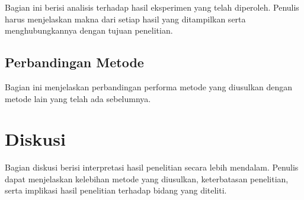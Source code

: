 Bagian ini berisi analisis terhadap hasil eksperimen yang telah
diperoleh. Penulis harus menjelaskan makna dari setiap hasil yang
ditampilkan serta menghubungkannya dengan tujuan penelitian.

\subsection{Perbandingan Metode}

Bagian ini menjelaskan perbandingan performa metode yang diusulkan
dengan metode lain yang telah ada sebelumnya.

\section{Diskusi}

Bagian diskusi berisi interpretasi hasil penelitian secara lebih
mendalam. Penulis dapat menjelaskan kelebihan metode yang diusulkan,
keterbatasan penelitian, serta implikasi hasil penelitian terhadap
bidang yang diteliti.